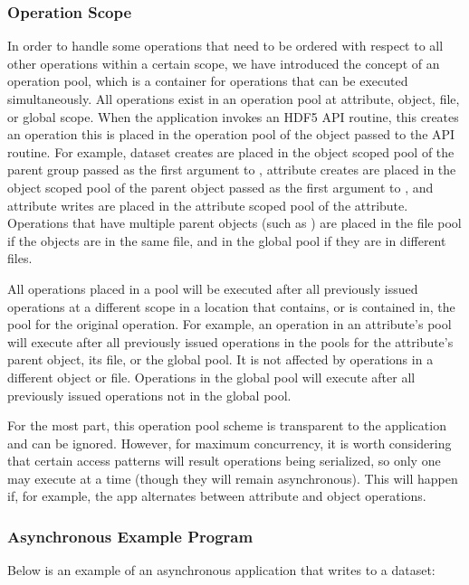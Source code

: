 \documentclass[../users_guide.tex]{subfiles}
\begin{document}
\subsubsection {Operation Scope}

In order to handle some operations that need to be ordered with respect to all
other operations within a certain scope, we have introduced the concept of an
operation pool, which is a container for operations that can be executed
simultaneously. All operations exist in an operation pool at attribute, object,
file, or global scope. When the application invokes an HDF5 API routine, this
creates an operation this is placed in the operation pool of the object passed
to the API routine. For example, dataset creates are placed in the object scoped
pool of the parent group passed as the first argument to
, attribute creates are placed in the object scoped
pool of the parent object passed as the first argument to
, and attribute writes are placed in the attribute
scoped pool of the attribute. Operations that have multiple parent objects (such
as ) are placed in the file pool if the objects are in
the same file, and in the global pool if they are in different files.

All operations placed in a pool will be executed after all previously issued
operations at a different scope in a location that contains, or is contained in,
the pool for the original operation. For example, an operation in an attribute's
pool will execute after all previously issued operations in the pools for the
attribute's parent object, its file, or the global pool. It is not affected by
operations in a different object or file. Operations in the global pool will
execute after all previously issued operations not in the global pool.

For the most part, this operation pool scheme is transparent to the application
and can be ignored. However, for maximum concurrency, it is worth considering
that certain access patterns will result operations being serialized, so only
one may execute at a time (though they will remain asynchronous). This will
happen if, for example, the app alternates between attribute and object
operations.

\subsubsection {Asynchronous Example Program}

Below is an example of an asynchronous application that writes to a dataset:
\end{document}
